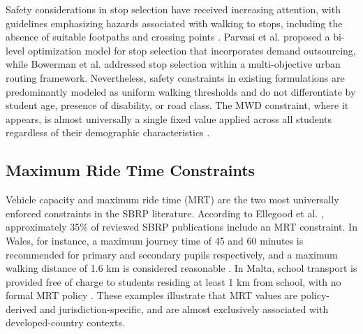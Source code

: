 \documentclass[journal]{IEEEtran}
\begin{document}
Safety considerations in stop selection have received increasing 
attention, with guidelines emphasizing hazards associated with walking 
to stops, including the absence of suitable footpaths and crossing 
points \cite{c4}. Parvasi et al. \cite{c13} proposed a bi-level 
optimization model for stop selection that incorporates demand 
outsourcing, while Bowerman et al. \cite{c14} addressed stop 
selection within a multi-objective urban routing framework. 
Nevertheless, safety constraints in existing formulations are 
predominantly modeled as uniform walking thresholds and do not 
differentiate by student age,  presence of disability, or road class. The 
MWD constraint, where it appears, is almost universally a single 
fixed value applied across all students regardless of their 
demographic characteristics \cite{c3}.

\subsection{Maximum Ride Time Constraints}

Vehicle capacity and maximum ride time (MRT) are the two most 
universally enforced constraints in the SBRP literature. According 
to Ellegood et al. \cite{c1}, approximately 35\% of reviewed SBRP 
publications include an MRT constraint. In Wales, for instance, a 
maximum journey time of 45 and 60 minutes is recommended for primary 
and secondary pupils respectively, and a maximum walking distance of 
1.6 km is considered reasonable \cite{c15}. In Malta, school 
transport is provided free of charge to students residing at least 
1 km from school, with no formal MRT policy \cite{c15}. These 
examples illustrate that MRT values are policy-derived and 
jurisdiction-specific, and are almost exclusively associated with 
developed-country contexts.
\end{document}
